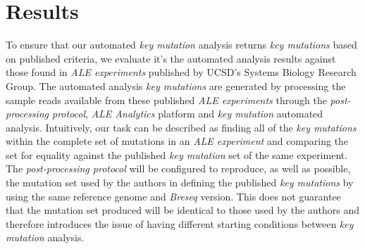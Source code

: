 \documentclass[12pt,final,masters,chapterheads]{ucsd}  %
\begin{document}

%
%

%
%
\section{Results}
%
%

To ensure that our automated \textit{key mutation} analysis returns \textit{key mutations} based on published criteria, we evaluate it's the automated analysis results against those found in \textit{ALE experiments} published by UCSD's Systems Biology Research Group. The automated analysis \textit{key mutations} are generated by processing the sample reads available from these published \textit{ALE experiments} through the \textit{post-processing protocol}, \textit{ALE Analytics} platform and \textit{key mutation} automated analysis. Intuitively, our task can be described as finding all of the \textit{key mutations} within the complete set of mutations in an \textit{ALE experiment} and comparing the set for equality against the published \textit{key mutation} set of the same experiment. The \textit{post-processing protocol} will be configured to reproduce, as well as possible, the mutation set used by the authors in defining the published \textit{key mutations} by using the same reference genome and \textit{Breseq} version. This does not guarantee that the mutation set produced will be identical to those used by the authors and therefore introduces the issue of having different starting conditions between \textit{key mutation} analysis.
\end{document}

